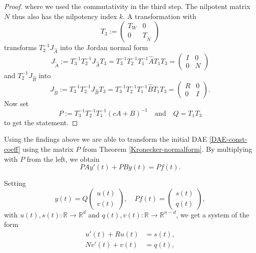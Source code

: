 \begin{proof}
	where we used the commutativity in the third step. The nilpotent matrix $N$ thus also has the nilpotency index $k$. A transformation with
	\begin{displaymath}
		T_3 := 
		\left(
		\begin{matrix}
			T_W & 0 \\
			0 & T_{\tilde{N}}
		\end{matrix}
		\right)
	\end{displaymath}
	transforms $T_2^{-1}J_{\hat{A}}$ into the Jordan normal form
	\begin{displaymath}
		J_{\tilde{A}} := T_3^{-1}T_2^{-1}J_{\hat{A}}T_3 = T_3^{-1}T_2^{-1}T_1^{-1}\hat{A}T_1T_3 = 
		\left(
		\begin{matrix}
			I & 0 \\
			0 & N
		\end{matrix}
		\right)
	\end{displaymath}
	and $T_2^{-1}J_{\hat{B}}$ into
	\begin{displaymath}
		J_{\tilde{B}} := T_3^{-1}T_2^{-1}J_{\hat{B}}T_3 = T_3^{-1}T_2^{-1}T_1^{-1}\hat{B}T_1T_3 = 
		\left(
		\begin{matrix}
			R & 0 \\
			0 & I
		\end{matrix}
		\right) .
	\end{displaymath}
	Now set
	\begin{displaymath}
		P:= T_3^{-1}T_2^{-1}T_1^{-1}(cA+B)^{-1} \quad \text{and} \quad Q = T_1T_3
	\end{displaymath}
	to get the statement.
\end{proof}

Using the findings above we are able to transform the initial DAE \eqref{DAE-const-coeff} using the matrix $P$ from Theorem \ref{Kronecker-normalform}. By multiplying with $P$ from the left, we obtain
\begin{displaymath}
	P A y'(t) + P B y(t) = P f(t) .
\end{displaymath}

Setting
\begin{displaymath}
	y(t) = Q
	\left(
	\begin{matrix}
		u(t) \\
		v(t)
	\end{matrix}  
	\right) 
	, \quad
	Pf(t) = 
	\left(
	\begin{matrix}
		s(t) \\
		q(t)
	\end{matrix}
	\right),
\end{displaymath}
with $u(t),s(t) : \mathbb{R} \to \mathbb{R}^d$ and $q(t),v(t) : \mathbb{R} \to \mathbb{R}^{n-d}$, we get a system of the form
\begin{equation}
	\label{transformed-DAE-const-coeff}
	\begin{aligned}
		u'(t) + Ru(t) &= s(t), \\
		Nv'(t) + v(t) &= q(t),
	\end{aligned}
\end{equation}

